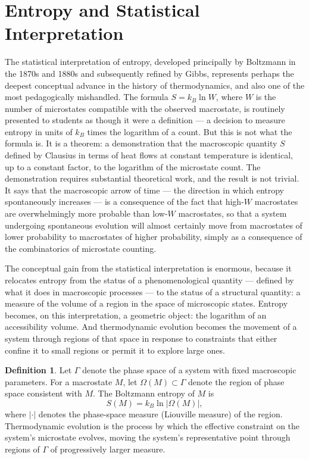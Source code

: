 \documentclass[12pt,openany]{book}
\theoremstyle{plain}
\theoremstyle{definition}
\newtheorem{definition}[theorem]{Definition}
\theoremstyle{remark}
\begin{document}
\section{Entropy and Statistical Interpretation}

The statistical interpretation of entropy, developed principally by Boltzmann in the 1870s and 1880s and subsequently refined by Gibbs, represents perhaps the deepest conceptual advance in the history of thermodynamics, and also one of the most pedagogically mishandled. The formula $S = k_B \ln W$, where $W$ is the number of microstates compatible with the observed macrostate, is routinely presented to students as though it were a definition — a decision to measure entropy in units of $k_B$ times the logarithm of a count. But this is not what the formula is. It is a theorem: a demonstration that the macroscopic quantity $S$ defined by Clausius in terms of heat flows at constant temperature is identical, up to a constant factor, to the logarithm of the microstate count. The demonstration requires substantial theoretical work, and the result is not trivial. It says that the macroscopic arrow of time — the direction in which entropy spontaneously increases — is a consequence of the fact that high-$W$ macrostates are overwhelmingly more probable than low-$W$ macrostates, so that a system undergoing spontaneous evolution will almost certainly move from macrostates of lower probability to macrostates of higher probability, simply as a consequence of the combinatorics of microstate counting.

The conceptual gain from the statistical interpretation is enormous, because it relocates entropy from the status of a phenomenological quantity — defined by what it does in macroscopic processes — to the status of a structural quantity: a measure of the volume of a region in the space of microscopic states. Entropy becomes, on this interpretation, a geometric object: the logarithm of an accessibility volume. And thermodynamic evolution becomes the movement of a system through regions of that space in response to constraints that either confine it to small regions or permit it to explore large ones.

\begin{definition}
Let $\Gamma$ denote the phase space of a system with fixed macroscopic parameters. For a macrostate $M$, let $\Omega(M) \subset \Gamma$ denote the region of phase space consistent with $M$. The Boltzmann entropy of $M$ is
\[
  S(M) = k_B \ln \lvert \Omega(M) \rvert,
\]
where $\lvert \cdot \rvert$ denotes the phase-space measure (Liouville measure) of the region. Thermodynamic evolution is the process by which the effective constraint on the system's microstate evolves, moving the system's representative point through regions of $\Gamma$ of progressively larger measure.
\end{definition}
\end{document}
